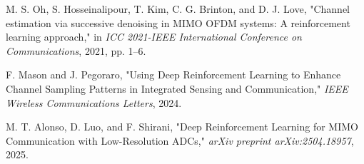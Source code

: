 \documentclass[journal,twocolumn]{IEEEtran}
\begin{document}
\begin{thebibliography}{20}
M. S. Oh, S. Hosseinalipour, T. Kim, C. G. Brinton, and D. J. Love, "Channel estimation via successive denoising in MIMO OFDM systems: A reinforcement learning approach," in \emph{ICC 2021-IEEE International Conference on Communications}, 2021, pp. 1--6.

F. Mason and J. Pegoraro, "Using Deep Reinforcement Learning to Enhance Channel Sampling Patterns in Integrated Sensing and Communication," \emph{IEEE Wireless Communications Letters}, 2024.

M. T. Alonso, D. Luo, and F. Shirani, "Deep Reinforcement Learning for MIMO Communication with Low-Resolution ADCs," \emph{arXiv preprint arXiv:2504.18957}, 2025.

\end{thebibliography}

\balance
\end{document}
